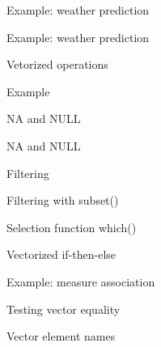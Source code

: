 \documentclass[xcolor=x11names]{beamer}
\renewcommand{\(}{\begin{columns}}
\renewcommand{\)}{\end{columns}}
\newcommand{\<}[1]{\begin{column}{#1}}
\renewcommand{\>}{\end{column}}
\begin{document}
\begin{frame}{Example: weather prediction}
	
\end{frame}

\begin{frame}{Example: weather prediction}
	
\end{frame}

\begin{frame}{Vetorized operations}
	
\end{frame}

\begin{frame}{Example}
	
\end{frame}

\begin{frame}{NA and NULL}
	
\end{frame}

\begin{frame}{NA and NULL}
	
\end{frame}

\begin{frame}{Filtering}
	
\end{frame}

\begin{frame}{Filtering with subset()}
	
\end{frame}

\begin{frame}{Selection function which()}
	
\end{frame}

\begin{frame}{Vectorized if-then-else}
	
\end{frame}

\begin{frame}{Example: measure association}
	
\end{frame}

\begin{frame}{Testing vector equality}
	
\end{frame}

\begin{frame}{Vector element names}
	
\end{frame}
\end{document}
